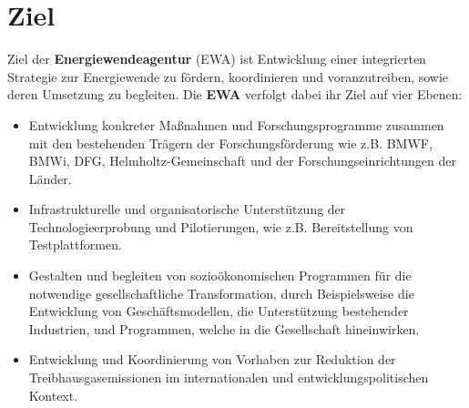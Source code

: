 \section{Ziel}

Ziel der \textbf{Energiewendeagentur} (EWA) ist Entwicklung einer integrierten Strategie zur Energiewende zu fördern, koordinieren und voranzutreiben, sowie deren Umsetzung zu begleiten.
%
Die \textbf{EWA} verfolgt dabei ihr Ziel auf vier Ebenen:
\begin{itemize}
	\item Entwicklung konkreter Maßnahmen und Forschungsprogramme zusammen mit den bestehenden Trägern der Forschungsförderung wie z.B. BMWF, BMWi, DFG, Helmholtz-Gemeinschaft und der Forschungseinrichtungen der Länder.
	
	\item Infrastrukturelle und organisatorische Unterstützung der Technologieerprobung und Pilotierungen, wie z.B. Bereitstellung von Testplattformen.
	
	\item Gestalten und begleiten von sozioökonomischen Programmen für die notwendige gesellschaftliche Transformation, durch Beispielsweise die Entwicklung von Geschäftsmodellen, die Unterstützung bestehender Industrien, und Programmen, welche in die Gesellschaft hineinwirken.
	
	\item Entwicklung und Koordinierung von Vorhaben zur Reduktion der Treibhausgasemissionen im internationalen und entwicklungspolitischen Kontext.
\end{itemize}

